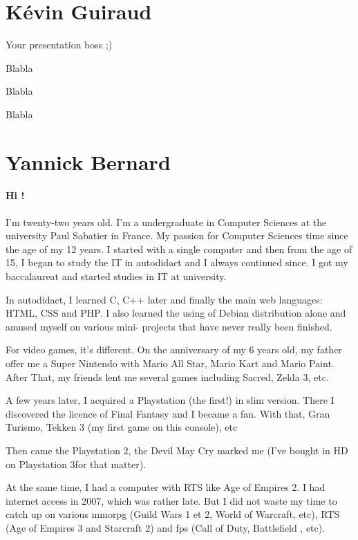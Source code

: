 \documentclass[a4paper,12pt]{book}
\begin{document}
\section*{K\'{e}vin Guiraud}
Your presentation boss ;)

Blabla

Blabla

Blabla
\section*{Yannick Bernard}
\paragraph{Hi !} I'm twenty-two years old. I'm a undergraduate in Computer Sciences at the university Paul Sabatier in France. My passion for Computer Sciences time since the age of my 12 years. I started with a single computer and then from the age of 15, I began to study the IT in autodidact and I always continued since. I got my baccalaureat and started studies in IT at university.

In autodidact, I learned C, C++ later and finally the main web languages: HTML, CSS and PHP. I also learned the using of Debian distribution alone and amused myself on various mini- projects that have never really been finished.

For video games, it's different. On the anniversary of my 6 years old, my father offer me a Super Nintendo with Mario All Star, Mario Kart and Mario Paint. After That, my friends lent me several games including Sacred, Zelda 3, etc.

A few years later, I acquired a Playstation (the first!) in slim version. There I discovered the licence of Final Fantasy and I became a fan. With that, Gran Turismo, Tekken 3 (my first game on this console), etc

Then came the Playstation 2, the Devil May Cry marked me (I've bought in HD on Playstation 3for that matter).

At the same time, I had a computer with RTS like Age of Empires 2. I had internet access in 2007, which was rather late. But I did not waste my time to catch up on various mmorpg (Guild Wars 1 et 2, World of Warcraft, etc), RTS (Age of Empires 3 and Starcraft 2) and fps (Call of Duty, Battlefield , etc).
\end{document}
